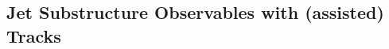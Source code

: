 \documentclass[UKenglish,texlive=2013]{\ATLASLATEXPATH atlasdoc}
\begin{document}






\subsection{Jet Substructure Observables with (assisted) Tracks}\label{sec:tas_jss}
\end{document}
